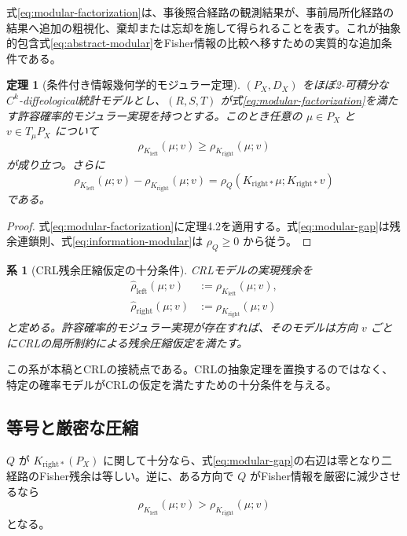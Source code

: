 \documentclass[a4paper,11pt]{ltjsarticle}
\theoremstyle{definition}
\theoremstyle{plain}
\newtheorem{theorem}[definition]{定理}
\newtheorem{corollary}[definition]{系}
\begin{document}
式\eqref{eq:modular-factorization}は、事後照合経路の観測結果が、事前局所化経路の結果へ追加の粗視化、棄却または忘却を施して得られることを表す。これが抽象的包含式\eqref{eq:abstract-modular}をFisher情報の比較へ移すための実質的な追加条件である。

\begin{theorem}[条件付き情報幾何学的モジュラー定理]
$(P_X,D_X)$ をほぼ2-可積分な $C^k$-diffeological統計モデルとし、$(R,S,T)$ が式\eqref{eq:modular-factorization}を満たす許容確率的モジュラー実現を持つとする。このとき任意の $\mu\in P_X$ と $v\in T_\mu P_X$ について
\begin{equation}
 \rho_{K_{\mathrm{left}}}(\mu;v)
 \geq
 \rho_{K_{\mathrm{right}}}(\mu;v)
 \label{eq:information-modular}
\end{equation}
が成り立つ。さらに
\begin{equation}
 \rho_{K_{\mathrm{left}}}(\mu;v)
 -\rho_{K_{\mathrm{right}}}(\mu;v)
 =
 \rho_Q(K_{\mathrm{right}*}\mu;
        K_{\mathrm{right}*}v)
 \label{eq:modular-gap}
\end{equation}
である。
\end{theorem}

\begin{proof}
式\eqref{eq:modular-factorization}に定理4.2を適用する。式\eqref{eq:modular-gap}は残余連鎖則、式\eqref{eq:information-modular}は $\rho_Q\geq0$ から従う。
\end{proof}

\begin{corollary}[CRL残余圧縮仮定の十分条件]
CRLモデルの実現残余を
\begin{align}
 \widehat\rho_{\mathrm{left}}(\mu;v)
 &:=\rho_{K_{\mathrm{left}}}(\mu;v),\\
 \widehat\rho_{\mathrm{right}}(\mu;v)
 &:=\rho_{K_{\mathrm{right}}}(\mu;v)
\end{align}
と定める。許容確率的モジュラー実現が存在すれば、そのモデルは方向 $v$ ごとにCRLの局所制約による残余圧縮仮定を満たす。
\end{corollary}

この系が本稿とCRLの接続点である。CRLの抽象定理を置換するのではなく、特定の確率モデルがCRLの仮定を満たすための十分条件を与える。

\subsection{等号と厳密な圧縮}

$Q$ が $K_{\mathrm{right}*}(P_X)$ に関して十分なら、式\eqref{eq:modular-gap}の右辺は零となり二経路のFisher残余は等しい。逆に、ある方向で $Q$ がFisher情報を厳密に減少させるなら
\begin{equation}
 \rho_{K_{\mathrm{left}}}(\mu;v)
 >
 \rho_{K_{\mathrm{right}}}(\mu;v)
\end{equation}
となる。
\end{document}
